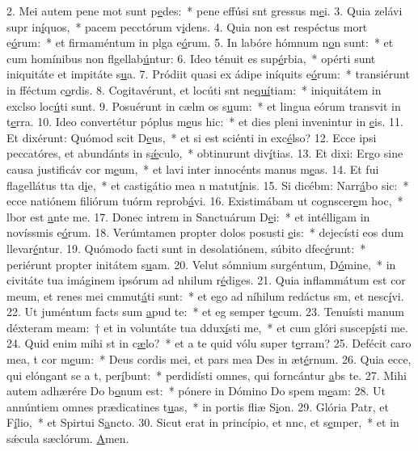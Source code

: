 2. Mei autem pene mot sunt p\uline{e}des:~* pene effúsi snt gressus m\uline{e}i.
3. Quia zelávi supr in\uline{í}quos,~* pacem pecctórum v\uline{i}dens.
4. Quia non est respéctus mort e\uline{ó}rum:~* et firmaméntum in plga e\uline{ó}rum.
5. In labóre hómnum n\uline{o}n sunt:~* et cum homínibus non flgellab\uline{ú}ntur:
6. Ideo ténuit es sup\uline{é}rbia,~* opérti sunt iniquitáte et impitáte s\uline{u}a.
7. Pródiit quasi ex ádipe iníquits e\uline{ó}rum:~* transiérunt in fféctum c\uline{o}rdis.
8. Cogitavérunt, et locúti snt ne\uline{quí}tiam:~* iniquitátem in exclso loc\uline{ú}ti sunt.
9. Posuérunt in cælm os s\uline{u}um:~* et lingua eórum transvit in t\uline{e}rra.
10. Ideo convertétur póplus m\uline{e}us hic:~* et dies pleni invenintur in \uline{e}is.
11. Et dixérunt: Quómod scit D\uline{e}us,~* et si est sciénti in exc\uline{é}lso?
12. Ecce ipsi peccatóres, et abundánts in s\uline{ǽ}culo,~* obtinurunt div\uline{í}tias.
13. Et dixi: Ergo sine causa justificáv cor m\uline{e}um,~* et lavi inter innocénts manus m\uline{e}as.
14. Et fui flagellátus tta d\uline{i}e,~* et castigátio mea n matut\uline{í}nis.
15. Si dicébm: Narr\uline{á}bo sic:~* ecce natiónem filiórum tuórm reprob\uline{á}vi.
16. Existimábam ut cognscer\uline{e}m hoc,~* lbor est \uline{a}nte me.
17. Donec intrem in Sanctuárum D\uline{e}i:~* et intélligam in novíssmis e\uline{ó}rum.
18. Verúmtamen propter dolos posusti \uline{e}is:~* dejecísti eos dum llevar\uline{é}ntur.
19. Quómodo facti sunt in desolatiónem, súbito dfec\uline{é}runt:~* periérunt propter initátem s\uline{u}am.
20. Velut sómnium surgéntum, D\uline{ó}mine,~* in civitáte tua imáginem ipsórum ad nhilum r\uline{é}diges.
21. Quia inflammátum est cor meum, et renes mei cmmut\uline{á}ti sunt:~* et ego ad níhilum redáctus sm, et nesc\uline{í}vi.
22. Ut juméntum facts sum \uline{a}pud te:~* et eg semper t\uline{e}cum.
23. Tenuísti manum déxteram meam:~† et in voluntáte tua ddux\uline{í}sti me,~* et cum glóri suscep\uline{í}sti me.
24. Quid enim mihi st in c\uline{æ}lo?~* et a te quid vólu super t\uline{e}rram?
25. Defécit caro mea, t cor m\uline{e}um:~* Deus cordis mei, et pars mea Des in æt\uline{é}rnum.
26. Quia ecce, qui elóngant se a t, per\uline{í}bunt:~* perdidísti omnes, qui forncántur \uline{a}bs te.
27. Mihi autem adhærére Do b\uline{o}num est:~* pónere in Dómino Do spem m\uline{e}am:
28. Ut annúntiem omnes prædicatines t\uline{u}as,~* in portis fliæ S\uline{i}on.
29. Glória Patr, et F\uline{í}lio,~* et Spirtui S\uline{a}ncto.
30. Sicut erat in princípio, et nnc, et s\uline{e}mper,~* et in sǽcula sæclórum. \uline{A}men.
